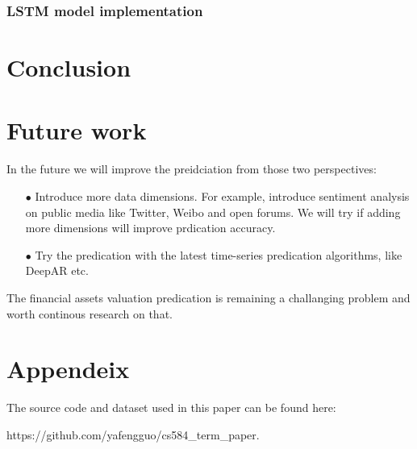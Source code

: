 \documentclass[10pt,twocolumn,letterpaper]{article}
\begin{document}
\subsubsection{LSTM model implementation}
\par

\section{Conclusion}


\section{Future work}

In the future we will improve the preidciation from those two perspectives:

\begin{itemize}
\item[$\bullet$] Introduce more data dimensions. For example, introduce sentiment analysis on public media like Twitter, Weibo and open forums. We will try if adding more dimensions will improve prdication accuracy.
\item[$\bullet$] Try the predication with the latest time-series predication algorithms, like DeepAR etc.

\end{itemize}

The financial assets valuation predication is remaining a challanging problem and worth continous research on that.

\section{Appendeix}

The source code and dataset used in this paper can be found here: 
\par
https://github.com/yafengguo/cs584\_term\_paper.

{\small


}
\end{document}
